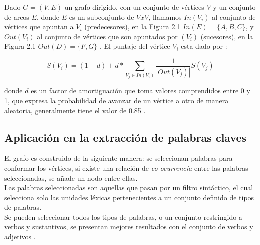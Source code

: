 Dado $G=(V,E)$ un grafo dirigido, con un conjunto de v\'ertices $V$ y un conjunto
de arcos $E$, donde $E$ es un subconjunto de $V x V$, llamamos $In(V_i)$ al
conjunto de v\'ertices que apuntan a $V_i$ (predecesores),  en la Figura 2.1
$In(E)=\{A,B,C\}$, y $Out(V_i)$ al conjunto de v\'ertices que son apuntados por $(V_i)$
(sucesores), en la Figura 2.1 $Out(D)=\{F,G\}$ . El puntaje del v\'ertice $V_i$ 
esta dado por \cite{SBLP98}:

\begin{equation}
	S(V_i) = (1 - d) + d * \sum_{V_j\in In(V_i)}{\frac{1}{|Out(V_j)|}S(V_j)}
\end{equation}

donde $d$ es un factor de amortiguaci\'on que toma valores comprendidos entre
0 y 1, que expresa la probabilidad de avanzar de un v\'ertice a otro de manera
aleatoria, generalmente tiene el valor de 0.85 \cite{SBLP98}.

\subsection{Aplicaci\'on en la extracci\'on de palabras claves}
El grafo es construido de la siguiente manera: se seleccionan palabras  para 
conformar los v\'ertices, si existe una relaci\'on de \emph{co-ocurrencia} entre 
las palabras seleccionadas, se a\~nade un nodo entre ellas. \\

Las palabras seleccionadas son aquellas que pasan por un filtro sint\'actico, el cual
selecciona solo las unidades l\'exicas pertenecientes a un conjunto definido de tipos
de palabras. \\

Se pueden seleccionar todos los tipos de palabras, o un conjunto restringido a verbos
y sustantivos, se presentan mejores resultados con el conjunto de verbos y
adjetivos \cite{RMPT04} .
